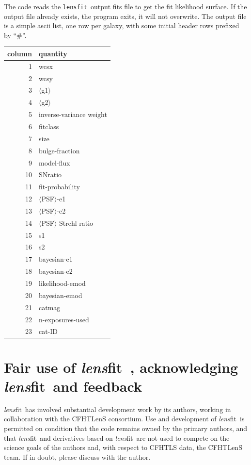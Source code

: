 \documentclass{article}
\def\lensfit{{\tt lensfit}\ }
\def\lensfitsuite{{\em lens}fit\ }
\def\<{{$\langle$}}
\def\>{{$\rangle$}}
\begin{document}
The code reads the \lensfit output
fits file to get the fit likelihood surface. 
If the output file already exists, the program exits, it will not 
overwrite. The output file is a simple ascii list, one row per galaxy, with some initial
header rows prefixed by ``\#''.

\begin{tabular}{|r|l|}
\hline
column & quantity \\
\hline
 1  & wcsx \\ 
 2  & wcsy \\
 3  & \<g1\> \\
 4  & \<g2\> \\
 5  & inverse-variance weight  \\
 6  & fitclass  \\
 7  & size  \\
 8  & bulge-fraction  \\
 9  & model-flux  \\
10  & SNratio  \\
11  & fit-probability  \\
12  & \<PSF\>-e1  \\
13  & \<PSF\>-e2  \\
14  & \<PSF\>-Strehl-ratio  \\
15  & s1  \\
16  & s2  \\
17  & bayesian-e1  \\
18  & bayesian-e2  \\
19  & likelihood-emod  \\
20  & bayesian-emod  \\
21  & catmag  \\
22  & n-exposures-used  \\
23  & cat-ID \\
\hline
\end{tabular}


\section{Fair use of {\lensfitsuite}, acknowledging \lensfitsuite and feedback}
\lensfitsuite has involved substantial development work by its authors, working
in collaboration with the CFHTLenS consortium.  Use and development of \lensfitsuite is 
permitted on condition that the code remains owned by the primary authors,
and that \lensfitsuite and derivatives based on \lensfitsuite are not used to
compete on the science goals of the authors and, with respect to
CFHTLS data, the CFHTLenS team.  If in doubt, please discuss with the author.
\end{document}
